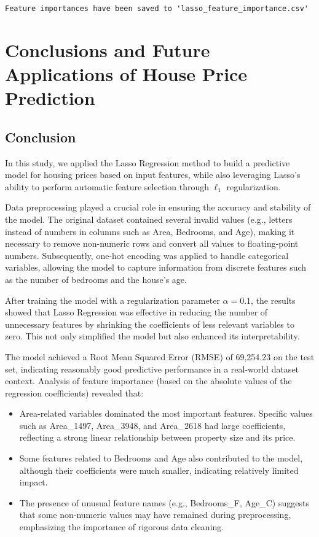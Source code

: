 \documentclass[12pt, a4paper]{report}
\begin{document}
\begin{lstlisting}[style=pythonstyle]
Feature importances have been saved to 'lasso_feature_importance.csv'
\end{lstlisting}

\newpage


\chapter{Conclusions and Future Applications of House
Price Prediction}
\section{Conclusion}

In this study, we applied the Lasso Regression method to build a predictive model for housing prices based on input features, while also leveraging Lasso’s ability to perform automatic feature selection through $\ell_1$ regularization.

Data preprocessing played a crucial role in ensuring the accuracy and stability of the model. The original dataset contained several invalid values (e.g., letters instead of numbers in columns such as Area, Bedrooms, and Age), making it necessary to remove non-numeric rows and convert all values to floating-point numbers. Subsequently, one-hot encoding was applied to handle categorical variables, allowing the model to capture information from discrete features such as the number of bedrooms and the house’s age.

After training the model with a regularization parameter $\alpha = 0.1$, the results showed that Lasso Regression was effective in reducing the number of unnecessary features by shrinking the coefficients of less relevant variables to zero. This not only simplified the model but also enhanced its interpretability.

The model achieved a Root Mean Squared Error (RMSE) of 69,254.23 on the test set, indicating reasonably good predictive performance in a real-world dataset context. Analysis of feature importance (based on the absolute values of the regression coefficients) revealed that:

\begin{itemize}
    \item Area-related variables dominated the most important features. Specific values such as Area\_1497, Area\_3948, and Area\_2618 had large coefficients, reflecting a strong linear relationship between property size and its price.
    \item Some features related to Bedrooms and Age also contributed to the model, although their coefficients were much smaller, indicating relatively limited impact.
    \item The presence of unusual feature names (e.g., Bedrooms\_F, Age\_C) suggests that some non-numeric values may have remained during preprocessing, emphasizing the importance of rigorous data cleaning.
\end{itemize}
\end{document}
